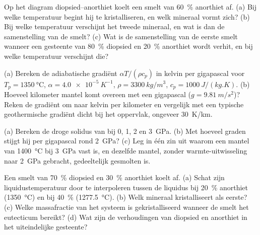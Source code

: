 \begin{exercise}[$\star$]\label{exo:b2:mantle-melting:2}
Op het diagram diopsied--anorthiet koelt een smelt van \qty{60}{\percent} anorthiet
af. (a) Bij welke temperatuur begint hij te kristalliseren, en welk mineraal
vormt zich? (b) Bij welke temperatuur verschijnt het tweede mineraal, en wat is dan
de samenstelling van de smelt? (c) Wat is de samenstelling van de eerste smelt wanneer
een gesteente van \qty{80}{\percent} diopsied en \qty{20}{\percent} anorthiet wordt verhit,
en bij welke temperatuur verschijnt die?
\end{exercise}

\begin{exercise}[$\star$]\label{exo:b2:mantle-melting:3}
(a) Bereken de adiabatische gradiënt $\alpha T/(\rho c_p)$ in kelvin per gigapascal
voor $T_p = \qty{1350}{\celsius}$, $\alpha = \qty{4.0e-5}{K^{-1}}$, $\rho =
\qty{3300}{kg/m^3}$, $c_p = \qty{1000}{J/(kg.K)}$. (b) Hoeveel kilometer
mantel komt overeen met een gigapascal ($g = \qty{9.81}{m/s^2}$)? Reken de gradiënt om naar kelvin
per kilometer en vergelijk met een typische geothermische gradiënt dicht bij het oppervlak,
ongeveer \qty{30}{K/km}.
\end{exercise}

\begin{exercise}[$\star$]\label{exo:b2:mantle-melting:4}
(a) Bereken de droge solidus van  bij 0, 1, 2 en \qty{3}{GPa}. (b) Met hoeveel
graden stijgt hij per gigapascal rond \qty{2}{GPa}? (c) Leg in één
zin uit waarom een mantel van \qty{1400}{\celsius} bij \qty{3}{GPa} vast is, en dezelfde
mantel, zonder warmte-uitwisseling naar \qty{2}{GPa} gebracht, gedeeltelijk gesmolten is.
\end{exercise}

\begin{exercise}[$\star\star$]\label{exo:b2:mantle-melting:5}
Een smelt van \qty{70}{\percent} diopsied en \qty{30}{\percent} anorthiet koelt af.
(a) Schat zijn liquidustemperatuur door te interpoleren tussen de liquidus bij
\qty{20}{\percent} anorthiet (\qty{1350}{\celsius}) en bij \qty{40}{\percent}
(\qty{1277.5}{\celsius}). (b) Welk mineraal kristalliseert als eerste? (c) Welke
massafractie van het systeem is gekristalliseerd wanneer de smelt het eutecticum bereikt?
(d) Wat zijn de verhoudingen van diopsied en anorthiet in het uiteindelijke gesteente?
\end{exercise}

